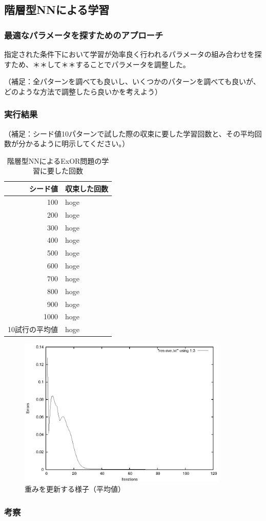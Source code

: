 \subsection{階層型NNによる学習}
\subsubsection{最適なパラメータを探すためのアプローチ}
指定された条件下において学習が効率良く行われるパラメータの組み合わせを探
すため、＊＊して＊＊することでパラメータを調整した。

（補足：全パターンを調べても良いし、いくつかのパターンを調べても良いが、
どのような方法で調整したら良いかを考えよう）


\subsubsection{実行結果}

（補足：シード値10パターンで試した際の収束に要した学習回数と、その平均回数が分かるように明示してください。）
\begin{table}[htb]
 \begin{center}
  \caption{階層型NNによるExOR問題の学習に要した回数}
  \label{table:level2}
  \begin{tabular}[htb]{r|l} \hline
   シード値 & 収束した回数 \\ \hline \hline
   100 & hoge \\ \hline
   200 & hoge \\ \hline
   300 & hoge \\ \hline
   400 & hoge \\ \hline
   500 & hoge \\ \hline
   600 & hoge \\ \hline
   700 & hoge \\ \hline
   800 & hoge \\ \hline
   900 & hoge \\ \hline
   1000 & hoge \\ \hline \hline
   10試行の平均値 & hoge \\ \hline
  \end{tabular}
 \end{center}
\end{table}

\begin{figure}[h]
 \begin{center}
  \includegraphics[width=10.0cm]{figs/sample2.eps}
  \caption{重みを更新する様子（平均値）}
  \label{fig:level2}
 \end{center}
\end{figure}


\subsubsection{考察}

